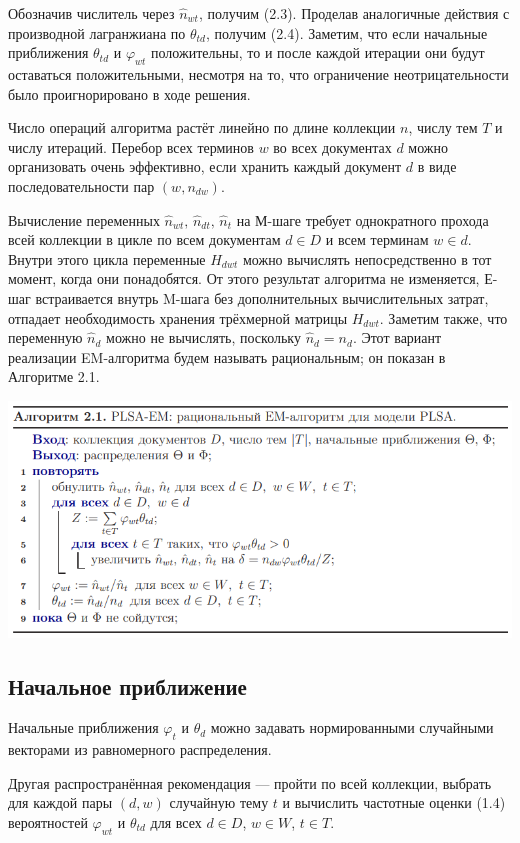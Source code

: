 \documentclass[article, 10pt]{disser}
\begin{document}
Обозначив числитель через $\hat{n}_{wt}$, получим (2.3). Проделав аналогичные действия с производной лагранжиана по $\theta_{td}$, получим (2.4). Заметим, что если начальные приближения $\theta_{td}$ и $\varphi_{wt}$ положительны, то и после каждой итерации они будут оставаться положительными, несмотря на то, что ограничение неотрицательности было проигнорировано в ходе решения.

Число операций алгоритма растёт линейно по длине коллекции $n$, числу тем $T$ и числу итераций. Перебор всех терминов $w$ во всех документах $d$ можно организовать очень эффективно, если хранить каждый документ $d$ в виде последовательности пар $(w, n_{dw})$.

Вычисление переменных $\hat{n}_{wt},\, \hat{n}_{dt},\, \hat{n}_t$ на М-шаге требует однократного прохода всей коллекции в цикле по всем документам $d \in D$ и всем терминам $w \in d$. Внутри этого цикла переменные $H_{dwt}$ можно вычислять непосредственно в тот момент, когда они понадобятся. От этого результат алгоритма не изменяется, Е-шаг встраивается внутрь M-шага без дополнительных вычислительных затрат, отпадает необходимость хранения трёхмерной матрицы $H_{dwt}$. Заметим также, что переменную $\hat{n}_d$ можно не вычислять, поскольку $\hat{n}_d=n_d$. Этот вариант реализации EM-алгоритма будем называть рациональным; он показан в Алгоритме 2.1.
\newpage
\begin{center}
    \includegraphics[scale = 0.75]{Em-алг.png}
\end{center}

\subsection{Начальное приближение}
Начальные приближения $\varphi_t$ и $\theta_d$ можно задавать нормированными случайными векторами из равномерного распределения.

Другая распространённая рекомендация --- пройти по всей коллекции, выбрать для каждой пары $(d, w)$ случайную тему $t$ и вычислить частотные оценки (1.4) вероятностей $\varphi_{wt}$ и $\theta_{td}$ для всех $d \in D$, $w \in W$, $t \in T$.
\end{document}
